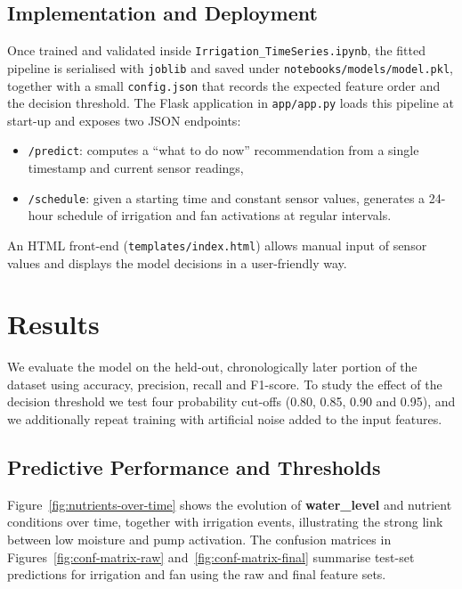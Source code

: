 \documentclass[sn-mathphys,Numbered]{sn-jnl}
\begin{document}
\subsection{Implementation and Deployment}

Once trained and validated inside \texttt{Irrigation\_TimeSeries.ipynb}, the fitted pipeline is serialised with \texttt{joblib} and saved under \texttt{notebooks/models/model.pkl}, together with a small \texttt{config.json} that records the expected feature order and the decision threshold.  
The Flask application in \texttt{app/app.py} loads this pipeline at start-up and exposes two JSON endpoints:
\begin{itemize}
    \item \texttt{/predict}: computes a ``what to do now'' recommendation from a single timestamp and current sensor readings,
    \item \texttt{/schedule}: given a starting time and constant sensor values, generates a 24-hour schedule of irrigation and fan activations at regular intervals.
\end{itemize}
An HTML front-end (\texttt{templates/index.html}) allows manual input of sensor values and displays the model decisions in a user-friendly way.

\section{Results}\label{sec:results}

We evaluate the model on the held-out, chronologically later portion of the dataset using accuracy, precision, recall and F1-score.  
To study the effect of the decision threshold we test four probability cut-offs (0.80, 0.85, 0.90 and 0.95), and we additionally repeat training with artificial noise added to the input features.

\subsection{Predictive Performance and Thresholds}

Figure~\ref{fig:nutrients-over-time} shows the evolution of \textbf{water\_level} and nutrient conditions over time, together with irrigation events, illustrating the strong link between low moisture and pump activation.  
The confusion matrices in Figures~\ref{fig:conf-matrix-raw} and~\ref{fig:conf-matrix-final} summarise test-set predictions for irrigation and fan using the raw and final feature sets.
\end{document}
